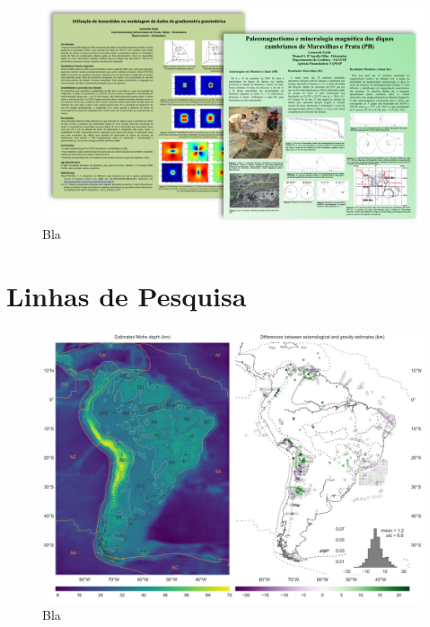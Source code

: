 \documentclass[11pt,a4paper,oneside]{book}
\begin{document}
\begin{figure}[h]
  \vspace{0.5cm}
  \begin{center}
    \includegraphics[width=\textwidth]{images/posters-iag.png}
  \end{center}
  \caption{
    Bla
  }
\end{figure}

\chapter{Linhas de Pesquisa}

\begin{figure}[h]
  \vspace{0.5cm}
  \begin{center}
    \includegraphics[width=\textwidth]{images/south-american-moho.jpg}
  \end{center}
  \caption{
    Bla
  }
\end{figure}
\end{document}
